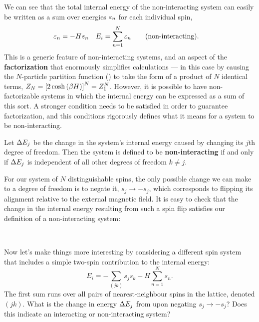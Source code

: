 We can see that the total internal energy of the non-interacting system can easily be written as a sum over energies $\varepsilon_n$ for each individual spin,
\begin{align*}
  \varepsilon_n & = -H s_n &
  E_i & = \sum_{n = 1}^N \varepsilon_n \qquad \mbox{(non-interacting)}.
\end{align*}
This is a generic feature of non-interacting systems, and an aspect of the \textbf{factorization} that enormously simplifies calculations --- in this case by causing the $N$-particle partition function () to take the form of a product of $N$ identical terms, $Z_N = \left[2\cosh\left(\beta H\right)\right]^N = Z_1^N$.
However, it is possible to have non-factorizable systems in which the internal energy can be expressed as a sum of this sort.
A stronger condition needs to be satisfied in order to guarantee factorization, and this conditions rigorously defines what it means for a system to be non-interacting.

\begin{shaded}
  Let $\Delta E_j$ be the change in the system's internal energy caused by changing its $j$th degree of freedom.
  Then the system is defined to be \textbf{non-interacting} if and only if $\Delta E_j$ is independent of all other degrees of freedom $k \ne j$. %
\end{shaded}

For our system of $N$ distinguishable spins, the only possible change we can make to a degree of freedom is to negate it, $s_j \to -s_j$, which corresponds to flipping its alignment relative to the external magnetic field.
It is easy to check that the change in the internal energy resulting from such a spin flip satisfies our definition of a non-interacting system:
\begin{mdframed}
  \ \\[80 pt]
\end{mdframed}

Now let's make things more interesting by considering a different spin system that includes a simple two-spin contribution to the internal energy:
\begin{equation}
  \label{eq:Ising_energy}
  E_i = -\sum_{(jk)} s_j s_k - H \sum_{n = 1}^N s_n.
\end{equation}
The first sum runs over all pairs of nearest-neighbour spins in the lattice, denoted $(jk)$.
What is the change in energy $\Delta E_j$ from  upon negating $s_j \to -s_j$?
Does this indicate an interacting or non-interacting system?
\begin{mdframed}
  \ \\[100 pt]
\end{mdframed}

